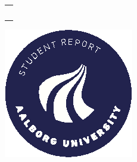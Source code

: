 %
\begin{titlepage}
\vspace*{\fill}
  \addtolength{\hoffset}{0.5\evensidemargin-0.5\oddsidemargin} %
  \noindent%
  {\color{white}\colorbox{aaublue}{\begin{tabular}{@{}p{\textwidth}@{}}
    \begin{center}
    \Huge{\textbf{
    }}
    \end{center}
    \begin{center}
      \Large{
      }
    \end{center}
    \vspace{0.2cm}
   \begin{center}
    {\Large
    }\\
    \vspace{0.2cm}
    {\large
    }
   \end{center}
   \vspace{0.2cm}
   \begin{center}
    {\Large
        1. semester master project
    }
   \end{center}
  \end{tabular}}}
  \vfill
  \begin{center}
    \includegraphics[width=0.2\paperwidth]{chapters/00Frontmatter/figures/aau_logo_circle_en}%
  \end{center}
\end{titlepage}
\clearpage
{}